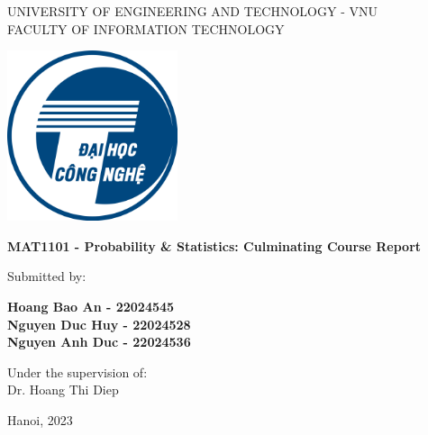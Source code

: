 
\begin{center} \centering
    {UNIVERSITY OF ENGINEERING AND TECHNOLOGY - VNU}\\
    {FACULTY OF INFORMATION TECHNOLOGY}\\
\end{center}


\vspace{15 mm}

\begin{center}
\includegraphics[width = 3\linewidth, height = 5cm, keepaspectratio]{figures/uet.png}
\begin{spacing}{1.5}
\textbf{\large {MAT1101 - Probability \& Statistics: Culminating Course Report}}\\
\end{spacing}
\vspace{10 mm}

\begin{spacing}{2.0}
\textbf{\LARGE {}}
\end{spacing}

\vspace{15 mm}

\begin{spacing}{0.8}
\medskip
{\large {Submitted by:}}
\end{spacing}
\end{center}


\begin{center}
\begin{spacing}{0.6}
\textbf{\Large {Hoang Bao An - 22024545}}\\
\textbf{\Large {Nguyen Duc Huy - 22024528}}\\
\textbf{\Large {Nguyen Anh Duc - 22024536}}\\
\end{spacing}
\end{center}

\vspace{5 mm}
\begin{center}
\begin{spacing}{1.3}
{Under the supervision of:}\\
    {\large {Dr. Hoang Thi Diep}}\\
\end{spacing}
\end{center}

\vspace{15 mm}
\begin{center}
    \large {Hanoi, 2023}
\end{center}

